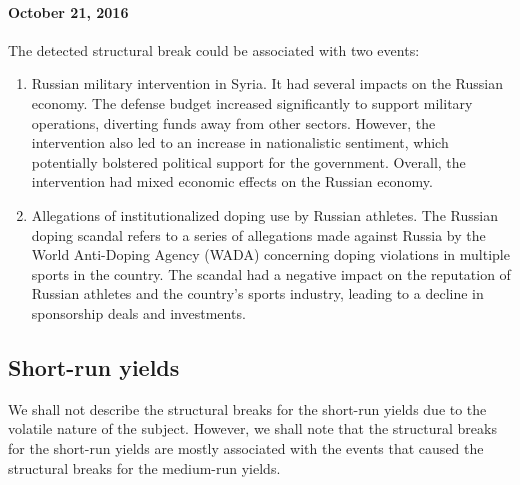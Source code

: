             \paragraph{October 21, 2016} The detected structural break could be associated with two events:
            \begin{enumerate}
                \item Russian military intervention in Syria. It had several impacts on the Russian economy. The defense budget increased significantly 
                to support military operations, diverting funds away from other sectors. However, the intervention also led to an increase 
                in nationalistic sentiment, which potentially bolstered political support for the government. Overall, the intervention 
                had mixed economic effects on the Russian economy.
                \item Allegations of institutionalized doping use by Russian athletes. The Russian doping scandal refers to a series of 
                allegations made against Russia by the World Anti-Doping Agency (WADA) concerning doping violations in multiple sports 
                in the country. The scandal had a negative impact on the reputation of Russian athletes and the country's sports industry, 
                leading to a decline in sponsorship deals and investments.
            \end{enumerate}

    \subsection{Short-run yields}
        We shall not describe the structural breaks for the short-run yields due to the volatile nature of the subject. However, we shall 
        note that the structural breaks for the short-run yields are mostly associated with the events that caused the structural breaks 
        for the medium-run yields.

